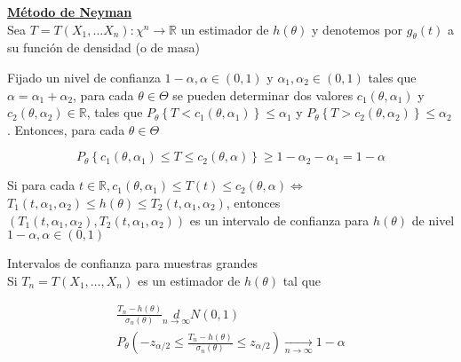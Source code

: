 \underline{\textbf{Método de Neyman}}\\
Sea $T=T\left(X_{1}, \ldots X_{n}\right): \chi^{n} \rightarrow \mathbb{R}$ un
estimador de $h(\theta)$ y denotemos por $g_{\theta}(t)$ a su función de
densidad (o de masa)

Fijado un nivel de confianza $1-\alpha, \alpha \in(0,1)$ y $\alpha_{1},
    \alpha_{2} \in(0,1)$ tales que $\alpha=\alpha_{1}+\alpha_{2}$, para cada
$\theta \in \Theta$ se pueden determinar dos valores $c_{1}\left(\theta,
    \alpha_{1}\right)$ y $c_{2}\left(\theta, \alpha_{2}\right) \in \mathbb{R}$,
tales que $P_{\theta}\left\{T<c_{1}\left(\theta, \alpha_{1}\right)\right\} \leq
    \alpha_{1}$ y $P_{\theta}\left\{T>c_{2}\left(\theta, \alpha_{2}\right)\right\}
    \leq \alpha_{2}$. Entonces, para cada $\theta \in \Theta$

$$
    P_{\theta}\left\{c_{1}\left(\theta, \alpha_{1}\right) \leq T \leq c_{2}(\theta, \alpha)\right\} \geq 1-\alpha_{2}-\alpha_{1}=1-\alpha
$$

Si para cada $t \in \mathbb{R}, c_{1}\left(\theta, \alpha_{1}\right) \leq T(t)
    \leq c_{2}(\theta, \alpha) \Leftrightarrow$\\ $T_{1}\left(t, \alpha_{1},
    \alpha_{2}\right) \leq h(\theta) \leq T_{2}\left(t, \alpha_{1},
    \alpha_{2}\right)$, entonces\\ $\left(T_{1}\left(t, \alpha_{1},
    \alpha_{2}\right), T_{2}\left(t, \alpha_{1}, \alpha_{2}\right)\right)$ es un
intervalo de confianza para $h(\theta)$ de nivel $1-\alpha, \alpha \in(0,1)$


Intervalos de confianza para muestras grandes\\ Si $T_{n}=T\left(X_{1}, \ldots,
    X_{n}\right)$ es un estimador de $h(\theta)$ tal que

$$
    \begin{gathered}
        \frac{T_{n}-h(\theta)}{\sigma_{n}(\theta)} \underset{n \rightarrow \infty}{d} N(0,1) \\
        P_{\theta}\left(-z_{\alpha / 2} \leq \frac{T_{n}-h(\theta)}{\sigma_{n}(\theta)} \leq z_{\alpha / 2}\right) \underset{n \rightarrow \infty}{\longrightarrow} 1-\alpha
    \end{gathered}
$$

